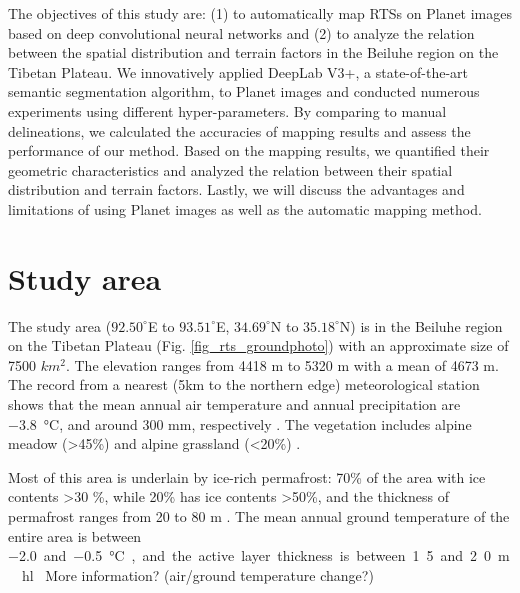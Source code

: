 \documentclass[preprint,12pt,authoryear]{elsarticle}
\begin{document}
The objectives of this study are: (1) to automatically map RTSs on Planet images based on deep convolutional neural networks and (2) to analyze the relation between the spatial distribution and terrain factors in the Beiluhe region on the Tibetan Plateau. We innovatively applied DeepLab V3+, a state-of-the-art semantic segmentation algorithm, to Planet images and conducted numerous experiments using different hyper-parameters. By comparing to manual delineations, we calculated the accuracies of mapping results and assess the performance of our method. Based on the mapping results, we quantified their geometric characteristics and analyzed the relation between their spatial distribution and terrain factors. Lastly, we will discuss the advantages and limitations of using Planet images as well as the automatic mapping method.  


\section{Study area}
\label{sec_studyarea}
The study area ($92.50^\circ$E to $93.51^\circ$E, $34.69^\circ$N to $35.18^\circ$N) is in the Beiluhe region on the Tibetan Plateau (Fig. \ref{fig_rts_groundphoto}) with an approximate size of 7500 $km^2$. The elevation ranges from 4418 m to 5320 m with a mean of 4673 m. The record from a nearest (5km to the northern edge) meteorological station shows that the mean annual air temperature and annual precipitation are \SI{-3.8}{\celsius}, and around 300 mm, respectively \citep{luo_thermokarst_2015}. The vegetation includes alpine meadow (\textgreater 45\%) and alpine grassland (\textless 20\%) \citep{luo_thermokarst_2015}. 

Most of this area is underlain by ice-rich permafrost: 70\% of the area with ice contents \textgreater 30 \%, while 20\% has ice contents \textgreater 50\%, and the thickness of permafrost ranges from 20 to 80 m \citep{zhou_geocryology_2000, luo_thermokarst_2015}. The mean annual ground temperature of the entire area is between \SI{-2.0} and \SI{-0.5}{\celsius}, and the active layer thickness is between 1.5 and 2.0 m \citep{zhou_geocryology_2000, luo_thermokarst_2015, wu2010changes, wu2015changes}. \hl{ More information? (air/ground temperature change?)}  %
\end{document}
